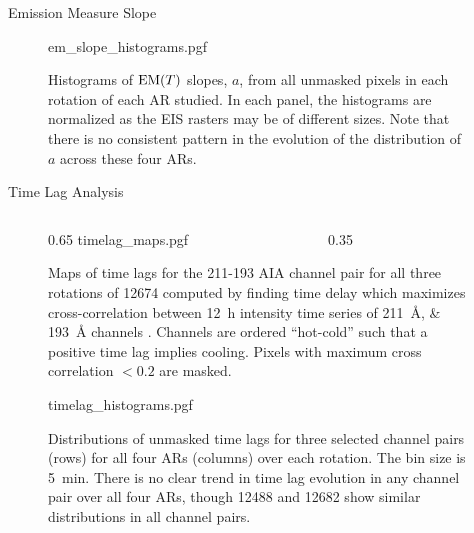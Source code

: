 \documentclass[final]{beamer}
\newcommand{\emd}{\textup{EM}(T)}
\newlength{\colwidth}
\begin{document}
\begin{frame}[t]
\begin{columns}[t]
\begin{column}{\colwidth}
\begin{block}{Emission Measure Slope}
    \vspace{-35pt}

    \begin{figure}
      \centering
      {em_slope_histograms.pgf}
      \vspace{-20pt}
      \caption{Histograms of $\emd$ slopes, $a$, from all unmasked pixels in each rotation of each AR studied. In each panel, the histograms are normalized as the EIS rasters may be of different sizes. Note that there \alert{is no consistent pattern in the evolution of the distribution of $a$ across these four ARs}.}
      \label{fig:em_slope_histograms}
    \end{figure}

  \end{block}

  \vspace{-35pt}

  \begin{block}{Time Lag Analysis}

    \vspace{-20pt}

    \begin{figure}
      \centering
      \begin{columns}[T]
        \begin{column}{0.65\colwidth}
          {timelag_maps.pgf}
        \end{column}
        \begin{column}{0.35\colwidth}
          \caption{Maps of time lags for the 211-193 AIA channel pair for all three rotations of 12674 computed by finding time delay which maximizes cross-correlation between \SI{12}{\hour} intensity time series of \SIlist{211;193}{\angstrom} channels \citep{viall_evidence_2012}. Channels are ordered ``hot-cold'' such that a positive time lag implies cooling. Pixels with maximum cross correlation $<0.2$ are masked.}
          \label{fig:timelag_maps}
        \end{column}
      \end{columns}
    \end{figure}

    \vspace{-35pt}

    \begin{figure}
      \centering
      {timelag_histograms.pgf}
      \caption{Distributions of unmasked time lags for three selected channel pairs (rows) for all four ARs (columns) over each rotation. The bin size is \SI{5}{\minute}. There is \alert{no clear trend in time lag evolution} in any channel pair over all four ARs, though \alert{12488 and 12682 show similar distributions in all channel pairs}.} 
      \label{fig:timelag_histograms}
    \end{figure}


\end{block}
\end{column}
\end{columns}
\end{frame}
\end{document}
